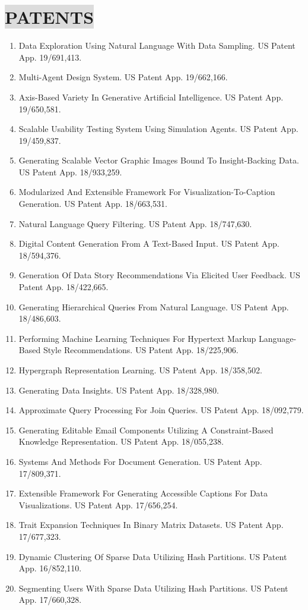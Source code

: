 \section*{
    \colorbox{gainsboro}{PATENTS}  
}

\begin{enumerate}[leftmargin=8mm,nosep]
    \item Data Exploration Using Natural Language With Data Sampling. US Patent App. 19/691,413.
    \item Multi-Agent Design System. US Patent App. 19/662,166.
    \item Axis-Based Variety In Generative Artificial Intelligence. US Patent App. 19/650,581.
    \item Scalable Usability Testing System Using Simulation Agents. US Patent App. 19/459,837.
    \item Generating Scalable Vector Graphic Images Bound To Insight-Backing Data. US Patent App. 18/933,259.
    \item Modularized And Extensible Framework For Visualization-To-Caption Generation. US Patent App. 18/663,531.
    \item Natural Language Query Filtering. US Patent App. 18/747,630.
    \item Digital Content Generation From A Text-Based Input. US Patent App. 18/594,376.
    \item Generation Of Data Story Recommendations Via Elicited User Feedback. US Patent App. 18/422,665.
    \item Generating Hierarchical Queries From Natural Language. US Patent App. 18/486,603.
    \item Performing Machine Learning Techniques For Hypertext Markup Language-Based Style Recommendations. US Patent App. 18/225,906.
    \item Hypergraph Representation Learning. US Patent App. 18/358,502.
    \item Generating Data Insights. US Patent App. 18/328,980.
    \item Approximate Query Processing For Join Queries. US Patent App. 18/092,779.
    \item Generating Editable Email Components Utilizing A Constraint-Based Knowledge Representation. US Patent App. 18/055,238.
    \item Systems And Methods For Document Generation. US Patent App. 17/809,371.
    \item Extensible Framework For Generating Accessible Captions For Data Visualizations. US Patent App. 17/656,254.
    \item Trait Expansion Techniques In Binary Matrix Datasets. US Patent App. 17/677,323.
    \item Dynamic Clustering Of Sparse Data Utilizing Hash Partitions. US Patent App. 16/852,110.
    \item Segmenting Users With Sparse Data Utilizing Hash Partitions. US Patent App. 17/660,328.
\end{enumerate}